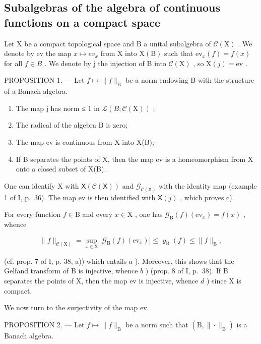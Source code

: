 \subsection{Subalgebras of the algebra of continuous functions on a compact space}

Let X be a compact topological space and B a unital subalgebra of \(\mathcal{C}(\mathrm{X})\) . We denote by ev the map \(x \mapsto ev_{x}\) from X into \(\mathrm{X}(\mathrm{B})\) such that \(\mathrm{ev}_{x}(f) = f(x)\) for all \(f \in B\) . We denote by j the injection of B into \(\mathcal{C}(\mathrm{X})\) , so \(\mathrm{X}(j) = \mathrm{ev}\) .

PROPOSITION 1. — Let \(f \mapsto \|f\|_{\mathrm{B}}\) be a norm endowing B with the structure of a Banach algebra.

\begin{enumerate}
\def\labelenumi{\alph{enumi})}
\item
  The map j has norm ≤ 1 in \(\mathcal{L}(B; \mathcal{C}(\mathrm{X}))\) ;
\item
  The radical of the algebra B is zero;
\item
  The map ev is continuous from X into X(B);
\item
  If B separates the points of X, then the map ev is a homeomorphism from X onto a closed subset of X(B).
\end{enumerate}

One can identify X with \(\mathsf{X}(\mathcal{C}(\mathsf{X}))\) and \(\mathcal{G}_{\mathcal{C}(\mathsf{X})}\) with the identity map (example 1 of I, p.~36). The map ev is then identified with \(\mathsf{X}(j)\) , which proves c).

For every function \(f \in \mathrm{B}\) and every \(x \in \mathrm{X}\) , one has \(\mathcal{G}_{\mathrm{B}}(f)(\mathrm{ev}_x) = f(x)\) , whence

\[
\| f \| _ {\mathcal {C} (\mathrm{X})} = \sup _ {x \in \mathrm{X}} | \mathcal {G} _ {\mathrm{B}} (f) (\mathrm{ev} _ {x}) | \leqslant \varrho_ {\mathrm{B}} (f) \leqslant \| f \| _ {\mathrm{B}},
\]

(cf. prop. 7 of I, p. 38, a)) which entails \(a\) ). Moreover, this shows that the Gelfand transform of B is injective, whence \(b\) ) (prop. 8 of I, p.~38). If B separates the points of X, then the map ev is injective, whence \(d\) ) since X is compact.

We now turn to the surjectivity of the map ev.

PROPOSITION 2. --- Let \(f \mapsto \|f\|_{\mathrm{B}}\) be a norm such that \((\mathrm{B}, \| \cdot \|_{\mathrm{B}})\) is a Banach algebra.


